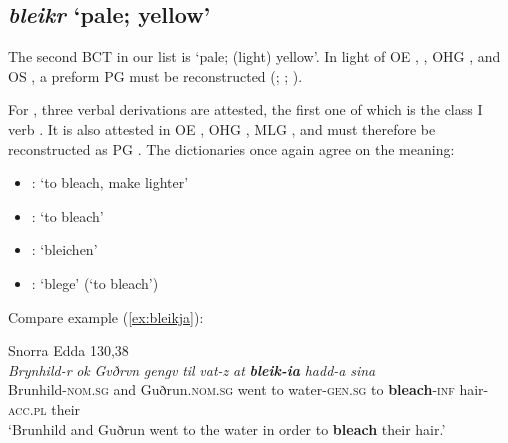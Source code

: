 \documentclass[output=paper,colorlinks,citecolor=brown]{langscibook}
\begin{document}
\subsection{\textit{bleikr} ‘pale; yellow’}
\label{sec:OWNyellow}

The second BCT  in our list is  ‘pale; (light) yellow’. In light of OE , , OHG , and OS , a preform PG  must be reconstructed (; ; ). 

For , three verbal derivations are attested, the first one of which is the class I verb . It is also attested in OE , OHG , MLG , and must therefore be reconstructed as PG . The dictionaries once again agree on the meaning:

\begin{itemize}
\item {}: ‘to bleach, make lighter’
\item {}: ‘to bleach’
\item {}: ‘bleichen’
\item {}: ‘blege’ (‘to bleach’)
\end{itemize}

Compare example (\ref{ex:bleikja}): 
 
\begin{exe} 
    \ex Snorra Edda 130,38 \label{ex:bleikja}\\
    \gll \textit{Brynhild-r} \textit{ok} \textit{Gvðrvn} \textit{gengv} \textit{til} \textit{vat-z} \textit{at} {\textit{\textbf{bleik-ia}} } \textit{hadd-a} \textit{sina}\\
       Brunhild-\textsc{nom.sg} and Guðrun.\textsc{nom.sg} went to water-\textsc{gen.sg} {to} \textbf{bleach}-\textsc{inf} hair-\textsc{acc.pl} their\\
    \glt ‘Brunhild and Guðrun went to the water in order to \textbf{bleach} their hair.’
\end{exe} 
\end{document}
